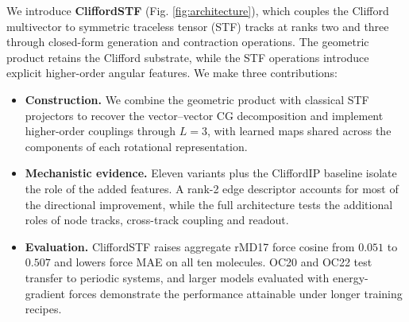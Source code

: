 We introduce \textbf{CliffordSTF} (Fig. \ref{fig:architecture}), which couples the Clifford multivector to symmetric traceless tensor (STF) tracks at ranks two and three through closed-form generation and contraction operations. The geometric product retains the Clifford substrate, while the STF operations introduce explicit higher-order angular features. We make three contributions:
\begin{itemize}
\item \textbf{Construction.} We combine the geometric product with classical STF projectors to recover the vector--vector CG decomposition and implement higher-order couplings through $L{=}3$, with learned maps shared across the components of each rotational representation.
\item \textbf{Mechanistic evidence.} Eleven variants plus the CliffordIP baseline isolate the role of the added features. A rank-2 edge descriptor accounts for most of the directional improvement, while the full architecture tests the additional roles of node tracks, cross-track coupling and readout.
\item \textbf{Evaluation.} CliffordSTF raises aggregate rMD17 \cite{rmd17} force cosine from $0.051$ to $0.507$ and lowers force MAE on all ten molecules. OC20 \cite{chanussot2021oc20} and OC22 \cite{tran2023oc22} test transfer to periodic systems, and larger models evaluated with energy-gradient forces demonstrate the performance attainable under longer training recipes.
\end{itemize}
